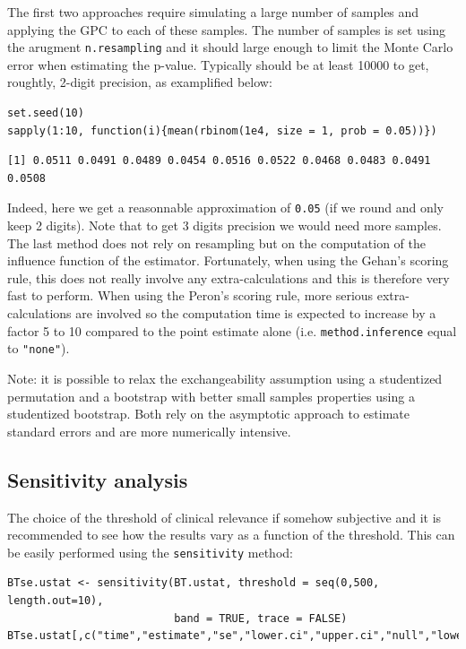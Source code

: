 \documentclass[12pt]{article}
\begin{document}
The first two approaches require simulating a large number of samples
and applying the GPC to each of these samples. The number of samples
is set using the arugment \texttt{n.resampling} and it should large enough to
limit the Monte Carlo error when estimating the p-value. Typically
should be at least 10000 to get, roughtly, 2-digit precision, as
examplified below:
\lstset{language=r,label= ,caption= ,captionpos=b,numbers=none}
\begin{lstlisting}
set.seed(10)
sapply(1:10, function(i){mean(rbinom(1e4, size = 1, prob = 0.05))})
\end{lstlisting}

\begin{verbatim}
[1] 0.0511 0.0491 0.0489 0.0454 0.0516 0.0522 0.0468 0.0483 0.0491 0.0508
\end{verbatim}

Indeed, here we get a reasonnable approximation of \texttt{0.05} (if we round
and only keep 2 digits). Note that to get 3 digits precision we would
need more samples. The last method does not rely on resampling but on
the computation of the influence function of the
estimator. Fortunately, when using the Gehan's scoring rule, this does
not really involve any extra-calculations and this is therefore very
fast to perform. When using the Peron's scoring rule, more serious
extra-calculations are involved so the computation time is expected to
increase by a factor 5 to 10 compared to the point estimate alone
(i.e. \texttt{method.inference} equal to \texttt{"none"}).

\bigskip

Note: it is possible to relax the exchangeability assumption using a
studentized permutation and a bootstrap with better small samples
properties using a studentized bootstrap. Both rely on the asymptotic
approach to estimate standard errors and are more numerically
intensive.

\clearpage

\subsection{Sensitivity analysis}
\label{sec:orgc286fc9}

The choice of the threshold of clinical relevance if somehow
subjective and it is recommended to see how the results vary as a
function of the threshold. This can be easily performed using the
\texttt{sensitivity} method:
\lstset{language=r,label= ,caption= ,captionpos=b,numbers=none}
\begin{lstlisting}
BTse.ustat <- sensitivity(BT.ustat, threshold = seq(0,500, length.out=10),
                          band = TRUE, trace = FALSE)
BTse.ustat[,c("time","estimate","se","lower.ci","upper.ci","null","lower.band","upper.band")]
\end{lstlisting}
\end{document}
